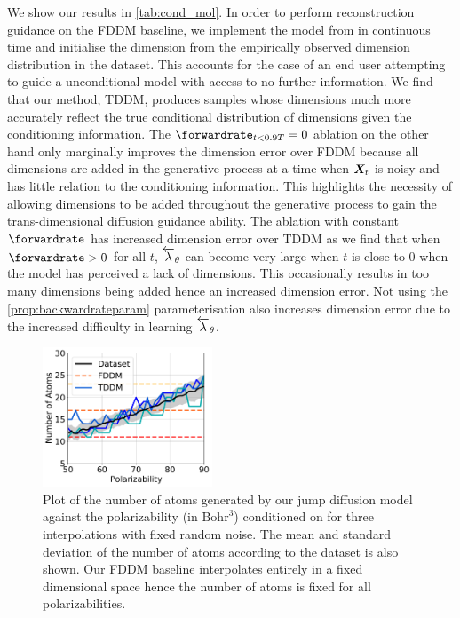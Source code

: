 We show our results in \cref{tab:cond_mol}. In order to perform reconstruction guidance on the FDDM baseline, we implement the model from \cite{hoogeboom2022equivariant} in continuous time and initialise the dimension from the empirically observed dimension distribution in the dataset.  This accounts for the case of an end user attempting to guide a unconditional model with access to no further information. We find that our method, TDDM, produces samples whose dimensions much more accurately reflect the true conditional distribution of dimensions given the conditioning information.
The $\forwardrate_{t<0.9T} = 0$ ablation on the other hand only marginally improves the dimension error over FDDM because all dimensions are added in the generative process at a time when ${\bm{X}}_t$ is noisy and has little relation to the conditioning information. This highlights the necessity of allowing dimensions to be added throughout the generative process to gain the trans-dimensional diffusion guidance ability. The ablation with constant $\forwardrate$ has increased dimension error over TDDM as we find that when $\forwardrate > 0$ for all $t$, $\overleftarrow{\lambda}_\theta$ can become very large when $t$ is close to 0 when the model has perceived a lack of dimensions. This occasionally results in too many dimensions being added hence an increased dimension error. Not using the \cref{prop:backwardrateparam} parameterisation also increases dimension error due to the increased difficulty in learning $\overleftarrow{\lambda}_\theta$.

\begin{figure}[t]
    \centering
    \includegraphics[width=0.45\textwidth]{figs/tddm/polarizability_vs_num_atoms.pdf}
    \caption{Plot of the number of atoms generated by our jump diffusion model against the polarizability (in $\text{Bohr}^3$) conditioned on for three interpolations with fixed random noise. The mean and standard deviation of the number of atoms according to the dataset is also shown. Our FDDM baseline interpolates entirely in a fixed dimensional space hence the number of atoms is fixed for all polarizabilities.}
    \label{fig:tddm-interp_plot}
\end{figure}

